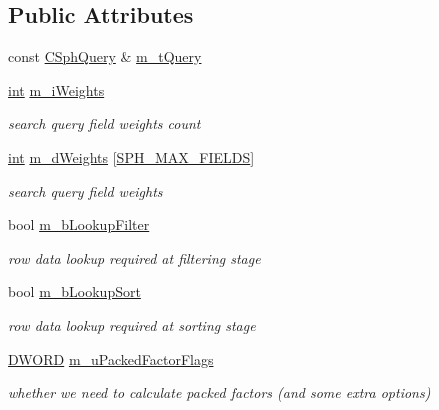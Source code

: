 \subsection*{Public Attributes}
\begin{DoxyCompactItemize}
\item 
const \hyperlink{classCSphQuery}{C\-Sph\-Query} \& \hyperlink{classCSphQueryContext_a7ae9bdda8aa24628726ebc663ba2fb5b}{m\-\_\-t\-Query}
\item 
\hyperlink{sphinxexpr_8cpp_a4a26e8f9cb8b736e0c4cbf4d16de985e}{int} \hyperlink{classCSphQueryContext_a02ad4d2f26c2e5bea1c44343aab35284}{m\-\_\-i\-Weights}
\begin{DoxyCompactList}\small\item\em search query field weights count \end{DoxyCompactList}\item 
\hyperlink{sphinxexpr_8cpp_a4a26e8f9cb8b736e0c4cbf4d16de985e}{int} \hyperlink{classCSphQueryContext_a328f2c06cdeabb2aa93b421986286f37}{m\-\_\-d\-Weights} \mbox{[}\hyperlink{sphinx_8h_ad5336c1a92b4f76b012a1a868a85b874}{S\-P\-H\-\_\-\-M\-A\-X\-\_\-\-F\-I\-E\-L\-D\-S}\mbox{]}
\begin{DoxyCompactList}\small\item\em search query field weights \end{DoxyCompactList}\item 
bool \hyperlink{classCSphQueryContext_adc2fdf623920be11414ea4940593e538}{m\-\_\-b\-Lookup\-Filter}
\begin{DoxyCompactList}\small\item\em row data lookup required at filtering stage \end{DoxyCompactList}\item 
bool \hyperlink{classCSphQueryContext_afb0929e88a2b40a38c50f04dd90929fd}{m\-\_\-b\-Lookup\-Sort}
\begin{DoxyCompactList}\small\item\em row data lookup required at sorting stage \end{DoxyCompactList}\item 
\hyperlink{sphinxstd_8h_a798af1e30bc65f319c1a246cecf59e39}{D\-W\-O\-R\-D} \hyperlink{classCSphQueryContext_ad5195a6e8fe8fe2d1dc2137842d19977}{m\-\_\-u\-Packed\-Factor\-Flags}
\begin{DoxyCompactList}\small\item\em whether we need to calculate packed factors (and some extra options) \end{DoxyCompactList}\item 

\end{DoxyCompactItemize}
